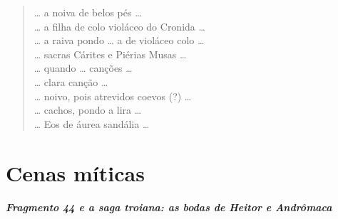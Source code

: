 {\begin{verse}
\ldots{} a noiva de belos pés \ldots{}\\[8pt]
\ldots{} a filha de colo violáceo do Cronida \ldots{}\\[8pt]
\ldots{} a raiva pondo \ldots{} a de violáceo colo \ldots{}\\[8pt]
\ldots{} sacras Cárites e Piérias Musas \ldots{}\\[8pt]
\ldots{} quando \ldots{} canções \ldots{}\\[8pt]
\ldots{} clara canção \ldots{}\\[8pt]
\ldots{} noivo, pois atrevidos coevos (?) \ldots{}\\[8pt]
\ldots{} cachos, pondo a lira \ldots{}\\[8pt]
\ldots{} Eos de áurea sandália \ldots{}\\[8pt]
\end{verse}

\chapter{Cenas míticas}

\paragraph{Fragmento 44 e a saga troiana: as bodas de Heitor e Andrômaca}

}
